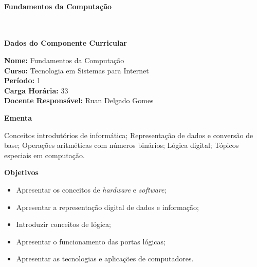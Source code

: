 \paragraph{Fundamentos da Computa\c{c}\~ao} \


\begin{snugshade}\begin{center}\textbf{
    Dados do Componente Curricular
}\end{center}\end{snugshade}

\noindent \textbf{Nome:}                Fundamentos da Computa\c{c}\~ao
\\        \textbf{Curso:}               Tecnologia em Sistemas para Internet
\\        \textbf{Período:}             \unit{1}{\degree}
\\        \textbf{Carga Horária:}       \unit{33}{\hour}
\\        \textbf{Docente Responsável:} Ruan Delgado Gomes


\begin{snugshade}\begin{center}\textbf{
    Ementa
\vphantom{q}}\end{center}\end{snugshade}

\noindent
Conceitos introdut\'orios de inform\'atica; Representa\c{c}\~ao de dados e convers\~ao de base; Opera\c{c}\~oes aritm\'eticas com n\'umeros bin\'arios; L\'ogica digital; T\'opicos especiais em computa\c{c}\~ao.

\begin{snugshade}\begin{center}\textbf{
    Objetivos
}\end{center}\end{snugshade}

\begin{itemize}

\item Apresentar os conceitos de \textit{hardware} e \textit{software};
\item Apresentar a representação digital de dados e informação;
\item Introduzir conceitos de l\'ogica;
\item Apresentar o funcionamento das portas lógicas;
\item Apresentar as tecnologias e aplicações de computadores.

\end{itemize} 

